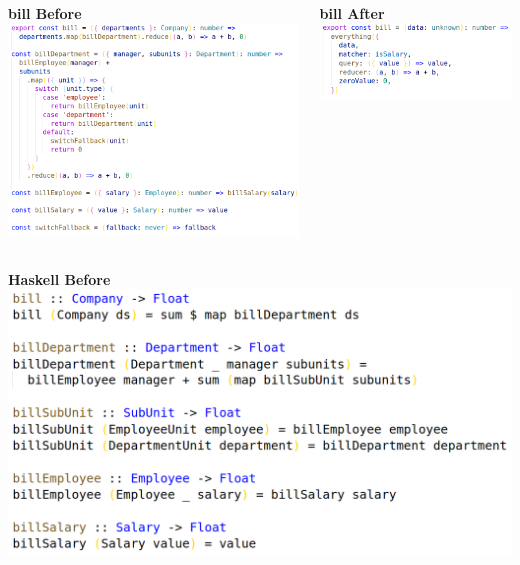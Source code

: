 \documentclass[14pt]{beamer}
\begin{document}
\begin{frame}
  \begin{columns}
    \begin{column}{.5\textwidth}
      \vspace{1em}
      \centering\textbf{bill Before}
      \includegraphics[height=0.7\textheight,width=\textwidth,keepaspectratio]{graphics/bill-naive-ts.png}
    \end{column}
    \begin{column}{.5\textwidth}
      \vspace{1em}
      \centering\textbf{bill After}
      \includegraphics[height=0.7\textheight,width=\textwidth,keepaspectratio]{graphics/bill-ts.png}
    \end{column}
  \end{columns}
\end{frame}

\begin{frame}
  \centering\textbf{Haskell Before}
  \vfill
  \includegraphics[height=0.8\textheight,width=\textwidth,keepaspectratio]{graphics/bill-naive-hs.png}
  \vfill
\end{frame}
\end{document}
